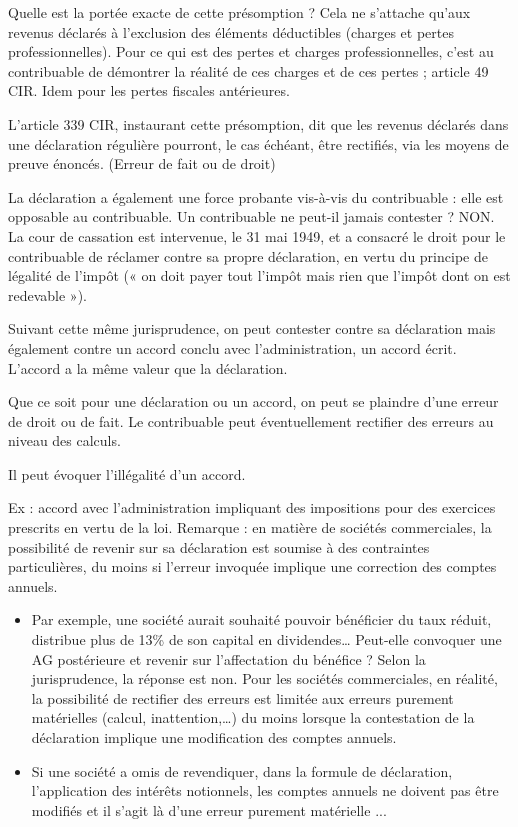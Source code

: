 \documentclass{book}
\begin{document}
Quelle est la portée exacte de cette présomption ? Cela ne s’attache qu’aux revenus déclarés à l’exclusion des éléments déductibles (charges et pertes professionnelles). Pour ce qui est des pertes et charges professionnelles, c’est au contribuable de démontrer la réalité de ces charges et de ces pertes ; article 49 CIR. Idem pour les pertes fiscales antérieures.

L’article 339 CIR, instaurant cette présomption, dit que les revenus déclarés dans une déclaration régulière pourront, le cas échéant, être rectifiés, via les moyens de preuve énoncés.  (Erreur de fait ou de droit)

La déclaration a également une force probante vis-à-vis du contribuable : elle est opposable au contribuable. Un contribuable ne peut-il jamais contester ? NON. La cour de cassation est intervenue, le 31 mai 1949, et a consacré le droit pour le contribuable de réclamer contre sa propre déclaration, en vertu du principe de légalité de l’impôt (« on doit payer tout l’impôt mais rien que l’impôt dont on est redevable »).

Suivant cette même jurisprudence, on peut contester contre sa déclaration mais également contre un accord conclu avec l’administration, un accord écrit. L'accord a la même valeur que la déclaration.

Que ce soit pour une déclaration ou un accord, on peut se plaindre d’une erreur de droit ou de fait. 
Le contribuable peut éventuellement rectifier des erreurs au niveau des calculs. 

Il peut évoquer l’illégalité d’un accord. 

Ex : accord avec l’administration impliquant des impositions pour des exercices prescrits en vertu de la loi.
Remarque : en matière de sociétés commerciales, la possibilité de revenir sur sa déclaration est soumise à des contraintes particulières, du moins si l’erreur invoquée implique une correction des comptes annuels. 

\begin{itemize}
\item Par exemple, une société aurait souhaité pouvoir bénéficier du taux réduit, distribue plus de 13\% de son capital en dividendes… Peut-elle convoquer une AG postérieure et revenir sur l’affectation du bénéfice ? Selon la jurisprudence, la réponse est non. Pour les sociétés commerciales, en réalité, la possibilité de rectifier des erreurs est limitée aux erreurs purement matérielles (calcul, inattention,…) du moins lorsque la contestation de la déclaration implique une modification des comptes annuels. 
\item Si une société a omis de revendiquer, dans la formule de déclaration, l’application des intérêts notionnels, les comptes annuels ne doivent pas être modifiés et il s’agit là d’une erreur purement matérielle ...
\end{itemize}
\end{document}
